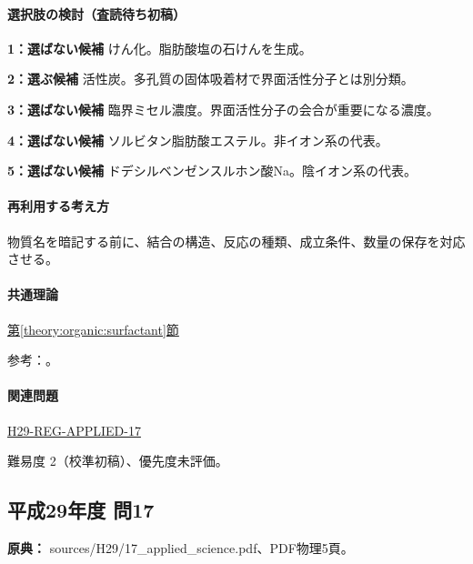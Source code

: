 \paragraph{選択肢の検討（査読待ち初稿）}\mbox{}\par

\noindent\textbf{1：選ばない候補} けん化。脂肪酸塩の石けんを生成。\par

\noindent\textbf{2：選ぶ候補} 活性炭。多孔質の固体吸着材で界面活性分子とは別分類。\par

\noindent\textbf{3：選ばない候補} 臨界ミセル濃度。界面活性分子の会合が重要になる濃度。\par

\noindent\textbf{4：選ばない候補} ソルビタン脂肪酸エステル。非イオン系の代表。\par

\noindent\textbf{5：選ばない候補} ドデシルベンゼンスルホン酸Na。陰イオン系の代表。\par

\paragraph{再利用する考え方} 物質名を暗記する前に、結合の構造、反応の種類、成立条件、数量の保存を対応させる。

\paragraph{共通理論} \hyperref[theory:organic:surfactant]{第\ref*{theory:organic:surfactant}節}

\par 参考：\cite{organic_cmc}。

\paragraph{関連問題} \hyperref[q:h29-reg-applied-17]{H29-REG-APPLIED-17}

\par 難易度 2（校準初稿）、優先度未評価。

\subsection{平成29年度 問17}
\label{q:h29-reg-applied-17}

\noindent\textbf{原典：} sources/H29/17\_applied\_science.pdf、PDF物理5頁。

